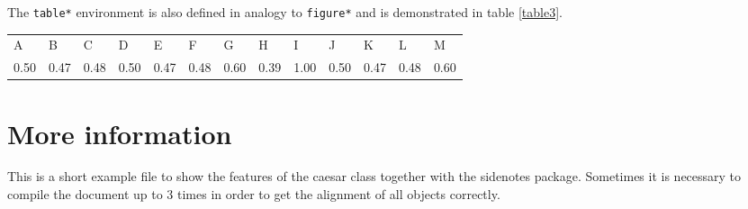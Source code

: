 \documentclass{caesar_book}
\begin{document}
The \texttt{table*} environment is also defined in analogy to \texttt{figure*} and is demonstrated in table \ref{table3}.
%
\begin{table*}[h!]
 \begin{tabular}{lllllllllllll}%
     A&B&C&D&E&F&G&H&I&J&K&L&M\\%
    0.50&0.47&0.48&0.50&0.47&0.48&0.60&0.39&1.00&0.50&0.47&0.48&0.60\\%
  \end{tabular}%
  \vspace{2pt}
  \caption{Even more numbers in a big table are shown here. This table spans across the full page, text width plus margin.\label{table3}}%
\end{table*}

%
\section{More information}
 This is a short example file to show the features of the caesar class together with the sidenotes package. Sometimes it is necessary to compile the document up to 3 times in order to get the alignment of all objects correctly.
%
\printbibliography[heading=bibintoc]
\end{document}
